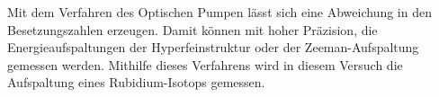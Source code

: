 Mit dem Verfahren des Optischen Pumpen lässt sich eine Abweichung in den Besetzungszahlen erzeugen.
Damit können mit hoher Präzision, die Energieaufspaltungen der Hyperfeinstruktur oder der Zeeman-Aufspaltung gemessen werden.
Mithilfe dieses Verfahrens wird in diesem Versuch die Aufspaltung eines Rubidium-Isotops gemessen.